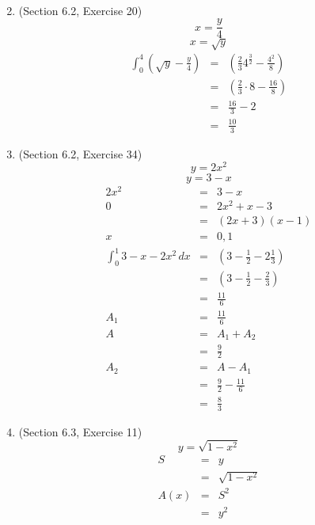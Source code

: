 \documentclass{article}
\begin{document}
\begin{enumerate}
\begin{eqnarray}
        \end{eqnarray}
    \item (Section 6.2, Exercise 20)
        $$x = \frac{y}{4}$$
        $$x = \sqrt{y}$$
        \begin{eqnarray}
            \int_0^4{\left(\sqrt{y} - \frac{y}{4}\right)} &=& \left(\frac{2}{3}4^{\frac{3}{2}} - \frac{4^2}{8}\right) \\
                                                          &=& \left(\frac{2}{3}\cdot8 - \frac{16}{8}\right) \\
                                                          &=& \frac{16}{3} - 2 \\
                                                          &=& \frac{10}{3}
        \end{eqnarray}
    \item (Section 6.2, Exercise 34)
        $$y = 2x^2$$
        $$y = 3 - x$$
        \begin{eqnarray}
            2x^2 &=& 3 - x \\
            0 &=& 2x^2 + x - 3 \\
              &=& \left(2x + 3\right)\left(x - 1\right) \\
            x &=& 0, 1 \\
            \int_0^1{3 - x - 2x^2\,dx} &=& \left(3 - \frac{1}{2} - 2\frac{1}{3}\right) \\
                                       &=& \left(3 - \frac{1}{2} - \frac{2}{3}\right) \\
                                       &=& \frac{11}{6} \\
            A_1 &=& \frac{11}{6} \\
            A &=& A_1 + A_2 \\
              &=& \frac{9}{2} \\
            A_2 &=& A - A_1 \\
                &=& \frac{9}{2} - \frac{11}{6} \\
                &=& \frac{8}{3}
        \end{eqnarray}
    \item (Section 6.3, Exercise 11)
        $$y = \sqrt{1 - x^2}$$
        \begin{eqnarray}
            S &=& y \\
              &=& \sqrt{1 - x^2} \\
            A(x) &=& S^2 \\
                 &=& y^2 \\

\end{eqnarray}
\end{enumerate}
\end{document}

